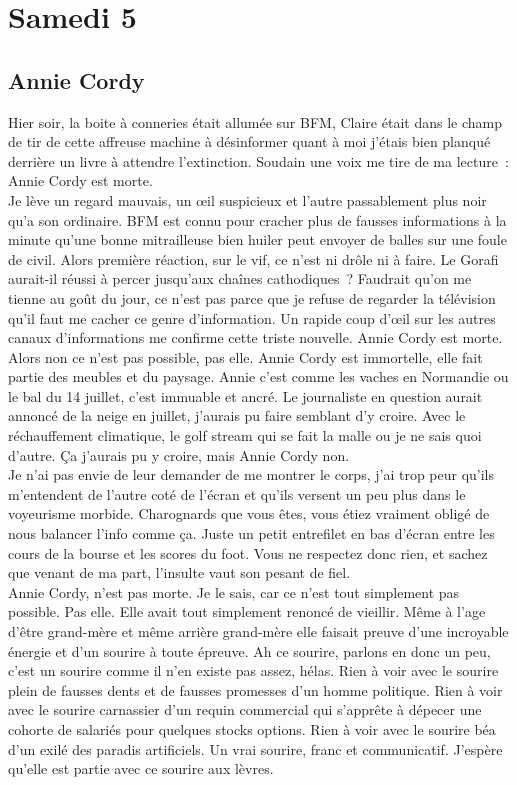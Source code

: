 ﻿\section*{Samedi 5}
\subsection*{Annie Cordy}
Hier soir, la boite à conneries était allumée sur BFM, Claire était dans le champ de tir de cette affreuse machine à désinformer quant à moi j’étais bien planqué derrière un livre à attendre l’extinction. Soudain une voix me tire de ma lecture : Annie Cordy est morte.\\
Je lève un regard mauvais, un œil suspicieux et l’autre passablement plus noir qu’a son ordinaire. BFM est connu pour cracher plus de fausses informations à la minute qu’une bonne mitrailleuse bien huiler peut envoyer de balles sur une foule de civil. Alors première réaction, sur le vif, ce n’est ni drôle ni à faire. Le Gorafi aurait-il réussi à percer jusqu’aux chaînes cathodiques ? Faudrait qu’on me tienne au goût du jour, ce n’est pas parce que je refuse de regarder la télévision qu’il faut me cacher ce genre d’information.
Un rapide coup d’œil sur les autres canaux d’informations me confirme cette triste nouvelle. Annie Cordy est morte.\\

Alors non ce n’est pas possible, pas elle. Annie Cordy est immortelle, elle fait partie des meubles et du paysage. Annie c’est comme les vaches en Normandie ou le bal du 14 juillet, c’est immuable et ancré. Le journaliste en question aurait annoncé de la neige en juillet, j’aurais pu faire semblant d’y croire. Avec le réchauffement climatique, le golf stream qui se fait la malle ou je ne sais quoi d’autre. Ça j’aurais pu y croire, mais Annie Cordy non. \\
Je n’ai pas envie de leur demander de me montrer le corps, j’ai trop peur qu’ils m’entendent de l’autre coté de l’écran et qu’ils versent un peu plus dans le voyeurisme morbide. Charognards que vous êtes, vous étiez vraiment obligé de nous balancer l’info comme ça. Juste un petit entrefilet en bas d’écran entre les cours de la bourse et les scores du foot. Vous ne respectez donc rien, et sachez que venant de ma part, l’insulte vaut son pesant de fiel.\\

Annie Cordy, n’est pas morte. Je le sais, car ce n’est tout simplement pas possible. Pas elle. Elle avait tout simplement renoncé de vieillir. Même à l’age d’être grand-mère et même arrière grand-mère elle faisait preuve d’une incroyable énergie et d’un sourire à toute épreuve. Ah ce sourire, parlons en donc un peu, c’est un sourire comme il n’en existe pas assez, hélas. Rien à voir avec le sourire plein de fausses dents et de fausses promesses d’un homme politique. Rien à voir avec le sourire carnassier d’un requin commercial qui s’apprête à dépecer une cohorte de salariés pour quelques stocks options. Rien à voir avec le sourire béa d’un exilé des paradis artificiels. Un vrai sourire, franc et communicatif. J’espère qu’elle est partie avec ce sourire aux lèvres. \\

